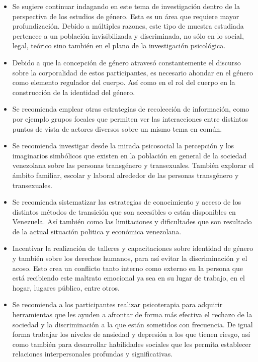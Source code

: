 \begin{itemize}
\item Se sugiere continuar indagando en este tema de
investigación dentro de la perspectiva de los estudios de género. Esta es un
área que requiere mayor profundización. Debido a múltiples razones, este tipo de
muestra estudiada pertenece a un población invisibilizada y discriminada, no
sólo en lo social, legal, teórico sino también en el plano de la investigación
psicológica.

\item Debido a que la concepción de género atravesó constantemente el discurso
sobre la corporalidad de estos participantes, es necesario ahondar en el género
como elemento regulador del cuerpo. Así como en el rol del cuerpo en la
construcción de la identidad del género.

\item Se recomienda emplear otras estrategias de recolección de información,
como por ejemplo grupos focales que permiten ver las interacciones entre
distintos puntos de vista de actores diversos sobre un mismo tema en común.

\item Se recomienda investigar desde la mirada psicosocial la percepción y los
imaginarios simbólicos que existen en la población en general de la sociedad
venezolana sobre las personas transgénero y transexuales. También explorar el
ámbito familiar, escolar y laboral alrededor de las personas transgénero y
transexuales.

\item Se recomienda sistematizar las estrategias de conocimiento y acceso de los
distintos métodos de transición que son accesibles o están disponibles en
Venezuela. Así también como las limitaciones y dificultades que son resultado de
la actual situación politica y económica venezolana.

\item Incentivar la realización de talleres y capacitaciones sobre identidad de
género y también sobre los derechos humanos, para así evitar la discriminación y
el acoso. Esto crea un conflicto tanto interno como externo en la persona que
está recibiendo este maltrato emocional ya sea en su lugar de trabajo, en
el hogar, lugares público, entre otros.

\item Se recomienda a los participantes realizar psicoterapia para adquirir
herramientas que les ayuden a afrontar de forma más efectiva el rechazo de la
sociedad y la discriminación a la que están sometidos con frecuencia. De igual
forma trabajar los niveles de ansiedad y depresión a los que tienen riesgo, así
como también para desarrollar habilidades sociales que les permita establecer
relaciones interpersonales profundas y significativas.
\end{itemize}
